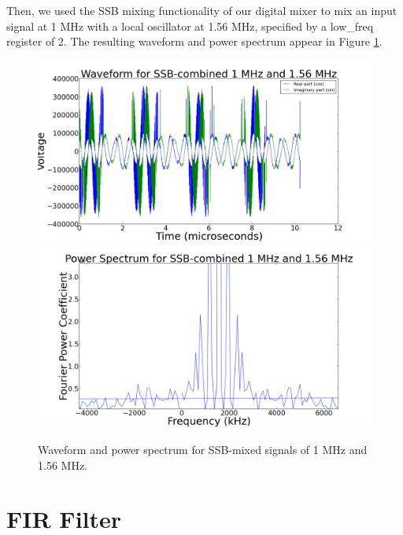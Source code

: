 \documentclass[11pt]{article}
\begin{document}
Then, we used the SSB mixing functionality of our digital mixer to mix an input signal at 1 MHz with a local oscillator at 1.56 MHz, specified by a low\_freq register of 2. The resulting waveform and power spectrum appear in Figure \ref{ssb}.

\begin{figure}
\centering
\includegraphics[scale=0.35]{pictures/ssbwave}
\includegraphics[scale=0.35]{pictures/ssbpower}
\caption{Waveform and power spectrum for SSB-mixed signals of 1 MHz and 1.56 MHz. \label{ssb}}
\end{figure}

\section{FIR Filter}
\end{document}
